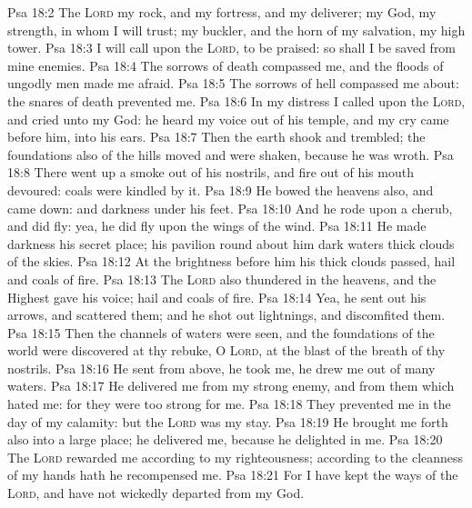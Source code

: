 \vs Psa 18:2 The \textsc{Lord}  my rock, and my fortress, and my deliverer; my God, my strength, in whom I will trust; my buckler, and the horn of my salvation,  my high tower.
\vs Psa 18:3 I will call upon the \textsc{Lord},  to be praised: so shall I be saved from mine enemies.
\vs Psa 18:4 The sorrows of death compassed me, and the floods of ungodly men made me afraid.
\vs Psa 18:5 The sorrows of hell compassed me about: the snares of death prevented me.
\vs Psa 18:6 In my distress I called upon the \textsc{Lord}, and cried unto my God: he heard my voice out of his temple, and my cry came before him,  into his ears.
\vs Psa 18:7 Then the earth shook and trembled; the foundations also of the hills moved and were shaken, because he was wroth.
\vs Psa 18:8 There went up a smoke out of his nostrils, and fire out of his mouth devoured: coals were kindled by it.
\vs Psa 18:9 He bowed the heavens also, and came down: and darkness  under his feet.
\vs Psa 18:10 And he rode upon a cherub, and did fly: yea, he did fly upon the wings of the wind.
\vs Psa 18:11 He made darkness his secret place; his pavilion round about him  dark waters  thick clouds of the skies.
\vs Psa 18:12 At the brightness  before him his thick clouds passed, hail  and coals of fire.
\vs Psa 18:13 The \textsc{Lord} also thundered in the heavens, and the Highest gave his voice; hail  and coals of fire.
\vs Psa 18:14 Yea, he sent out his arrows, and scattered them; and he shot out lightnings, and discomfited them.
\vs Psa 18:15 Then the channels of waters were seen, and the foundations of the world were discovered at thy rebuke, O \textsc{Lord}, at the blast of the breath of thy nostrils.
\vs Psa 18:16 He sent from above, he took me, he drew me out of many waters.
\vs Psa 18:17 He delivered me from my strong enemy, and from them which hated me: for they were too strong for me.
\vs Psa 18:18 They prevented me in the day of my calamity: but the \textsc{Lord} was my stay.
\vs Psa 18:19 He brought me forth also into a large place; he delivered me, because he delighted in me.
\vs Psa 18:20 The \textsc{Lord} rewarded me according to my righteousness; according to the cleanness of my hands hath he recompensed me.
\vs Psa 18:21 For I have kept the ways of the \textsc{Lord}, and have not wickedly departed from my God.
